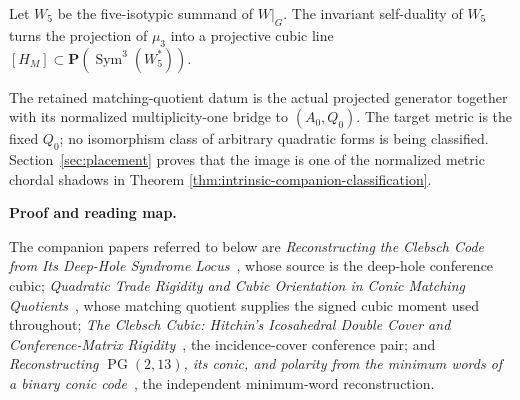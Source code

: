 \documentclass[11pt]{article}
\theoremstyle{definition}
\theoremstyle{remark}
\newcommand{\PP}{\mathbf P}
\newcommand{\Sym}{\operatorname{Sym}}
\begin{document}
Let \(W_5\) be the five-isotypic summand of \(W|_G\).  The invariant
self-duality of \(W_5\) turns the projection of \(\mu_3\) into a projective
cubic line \([H_M]\subset\PP(\Sym^3(W_5^*))\).

The retained matching-quotient datum is the actual projected generator together with
its normalized multiplicity-one bridge to \((A_0,Q_0)\).  The target metric is
the fixed \(Q_0\); no isomorphism class of arbitrary quadratic forms is being
classified.  Section~\ref{sec:placement} proves that the image is one of the
normalized metric chordal shadows in Theorem
\ref{thm:intrinsic-companion-classification}.

\medskip
\noindent\textbf{Proof and reading map.}
\begin{center}
\footnotesize
{}
\end{center}

The companion papers referred to below are \emph{Reconstructing the Clebsch
Code from Its Deep-Hole Syndrome Locus}~\cite{RuddRigidity2026}, whose source is the deep-hole conference
cubic; \emph{Quadratic Trade Rigidity and Cubic Orientation in Conic Matching
Quotients}~\cite{RuddFactorization2026}, whose matching quotient supplies the
signed cubic moment used throughout; \emph{The Clebsch Cubic: Hitchin's
Icosahedral Double Cover and Conference-Matrix Rigidity}~\cite{RuddPassages2026},
the incidence-cover conference pair; and \emph{Reconstructing
\(\operatorname{PG}(2,13)\), its conic, and polarity from the minimum words of a binary conic
code}~\cite{RuddPassant2026}, the independent minimum-word reconstruction.
\end{document}
